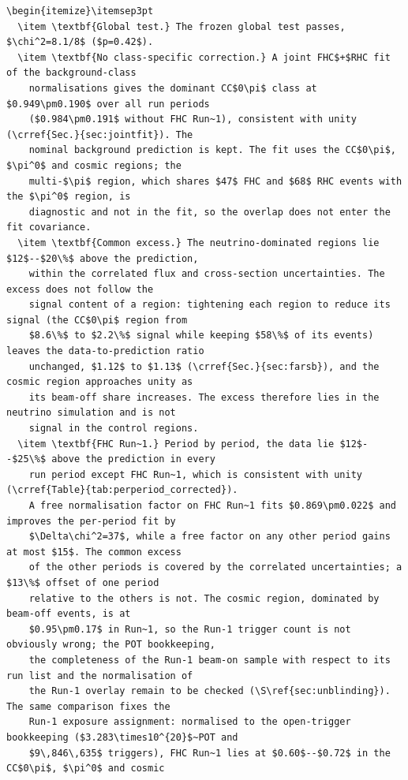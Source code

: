 \documentclass[11pt,a4paper]{article}
\newcommand{\crref}[2]{#1~\ref{CR-#2} of the control-sample note}
\begin{document}
\begin{lstlisting}[language={[LaTeX]TeX},basicstyle=\ttfamily\footnotesize,columns=fullflexible]
\begin{itemize}\itemsep3pt
  \item \textbf{Global test.} The frozen global test passes, $\chi^2=8.1/8$ ($p=0.42$).
  \item \textbf{No class-specific correction.} A joint FHC$+$RHC fit of the background-class
    normalisations gives the dominant CC$0\pi$ class at $0.949\pm0.190$ over all run periods
    ($0.984\pm0.191$ without FHC Run~1), consistent with unity (\crref{Sec.}{sec:jointfit}). The
    nominal background prediction is kept. The fit uses the CC$0\pi$, $\pi^0$ and cosmic regions; the
    multi-$\pi$ region, which shares $47$ FHC and $68$ RHC events with the $\pi^0$ region, is
    diagnostic and not in the fit, so the overlap does not enter the fit covariance.
  \item \textbf{Common excess.} The neutrino-dominated regions lie $12$--$20\%$ above the prediction,
    within the correlated flux and cross-section uncertainties. The excess does not follow the
    signal content of a region: tightening each region to reduce its signal (the CC$0\pi$ region from
    $8.6\%$ to $2.2\%$ signal while keeping $58\%$ of its events) leaves the data-to-prediction ratio
    unchanged, $1.12$ to $1.13$ (\crref{Sec.}{sec:farsb}), and the cosmic region approaches unity as
    its beam-off share increases. The excess therefore lies in the neutrino simulation and is not
    signal in the control regions.
  \item \textbf{FHC Run~1.} Period by period, the data lie $12$--$25\%$ above the prediction in every
    run period except FHC Run~1, which is consistent with unity (\crref{Table}{tab:perperiod_corrected}).
    A free normalisation factor on FHC Run~1 fits $0.869\pm0.022$ and improves the per-period fit by
    $\Delta\chi^2=37$, while a free factor on any other period gains at most $15$. The common excess
    of the other periods is covered by the correlated uncertainties; a $13\%$ offset of one period
    relative to the others is not. The cosmic region, dominated by beam-off events, is at
    $0.95\pm0.17$ in Run~1, so the Run-1 trigger count is not obviously wrong; the POT bookkeeping,
    the completeness of the Run-1 beam-on sample with respect to its run list and the normalisation of
    the Run-1 overlay remain to be checked (\S\ref{sec:unblinding}). The same comparison fixes the
    Run-1 exposure assignment: normalised to the open-trigger bookkeeping ($3.283\times10^{20}$~POT and
    $9\,846\,635$ triggers), FHC Run~1 lies at $0.60$--$0.72$ in the CC$0\pi$, $\pi^0$ and cosmic

\end{lstlisting}
\end{document}
